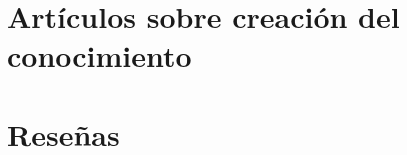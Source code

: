\documentclass[12pt,letterpaper]{book}
\begin{document}
\hojaportada
\hojalicencia

\tablacontenido
\hojapresentacion
\hojaeditorial
\mainmatter
\fancychapterstyle

\chapter{Artículos sobre creación del conocimiento}\BgThispage


%

\chapter{Reseñas}\BgThispage
%

%

\hojacontraportada
\end{document}
